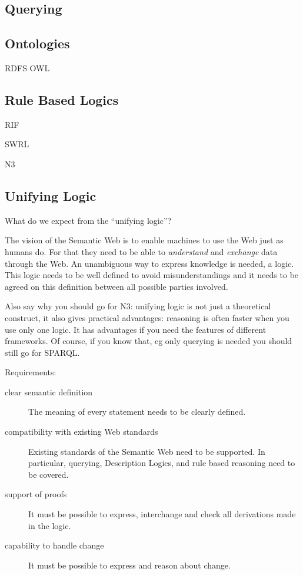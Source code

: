 \cite{rdf}
\subsection{Querying}
\subsection{Ontologies}
RDFS
OWL
\subsection{Rule Based Logics}
RIF

SWRL

N3

\cite{N3Logic}

\subsection{Unifying Logic}
What do we expect from the ``unifying logic''?

The vision of the Semantic Web is to enable machines to use the Web just as humans do. For that they need to be able to \emph{understand} and \emph{exchange} data through the Web. 
An unambiguous way to express knowledge is needed, a logic. 
This logic needs to be well defined to avoid misunderstandings and it needs to be agreed on this definition between all possible parties involved.


Also say why you should go for N3: unifying logic is not just a theoretical construct, it also gives practical advantages: reasoning is often faster when you use only one logic.  
It has advantages if you need 
the features of different frameworks. Of course, if you know that, eg only querying is needed you should still go for SPARQL.


Requirements:
\begin{description}
 \item[clear semantic definition] 
The meaning of every statement needs to be clearly defined.
 \item[compatibility with existing Web standards]  Existing standards of the Semantic Web need to be supported. 
 In particular, querying, Description Logics, and rule based reasoning need to be covered.
 \item[support of proofs] It must be possible to express, interchange and check all derivations made in the logic.
 \item[capability to handle change] It must be possible to express and reason about change.
\end{description}
